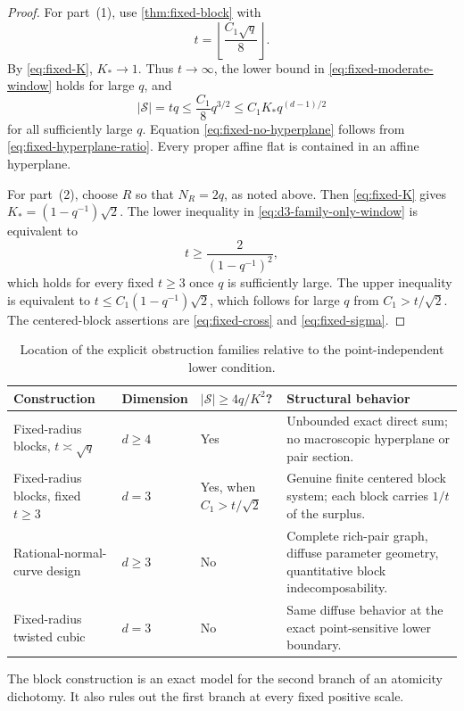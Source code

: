\documentclass[11pt,letterpaper]{amsart}
\theoremstyle{definition}
\theoremstyle{remark}
\newcommand{\1}{\mathbf 1}
\begin{document}
\begin{proof}
For part~\textup{(1)}, use \cref{thm:fixed-block} with
\[
 t=\left\lfloor\frac{C_1\sqrt q}{8}\right\rfloor.
\]
By \eqref{eq:fixed-K}, $K_*\to1$.  Thus $t\to\infty$, the lower bound in \eqref{eq:fixed-moderate-window} holds for large $q$, and
\[
 |\mathcal S|=tq\le\frac{C_1}{8}q^{3/2}
 \le C_1K_*q^{(d-1)/2}
\]
for all sufficiently large $q$.  Equation \eqref{eq:fixed-no-hyperplane} follows from \eqref{eq:fixed-hyperplane-ratio}.  Every proper affine flat is contained in an affine hyperplane.

For part~\textup{(2)}, choose $R$ so that $N_R=2q$, as noted above.  Then \eqref{eq:fixed-K} gives $K_*=(1-q^{-1})\sqrt2$.  The lower inequality in \eqref{eq:d3-family-only-window} is equivalent to
\[
 t\ge\frac{2}{(1-q^{-1})^2},
\]
which holds for every fixed $t\ge3$ once $q$ is sufficiently large.  The upper inequality is equivalent to $t\le C_1(1-q^{-1})\sqrt2$, which follows for large $q$ from $C_1>t/\sqrt2$.  The centered-block assertions are \eqref{eq:fixed-cross} and \eqref{eq:fixed-sigma}.
\end{proof}

\begin{table}[ht]
\centering
\small
\caption{Location of the explicit obstruction families relative to the point-independent lower condition.}
\label{tab:range-obstructions}
\begin{tabularx}{\textwidth}{@{}P{0.27\textwidth}P{0.16\textwidth}Y Y@{}}
\toprule
Construction & Dimension & $|\mathcal S|\ge4q/K^2$? & Structural behavior \\
\midrule
Fixed-radius blocks, $t\asymp\sqrt q$ & $d\ge4$ & Yes & Unbounded exact direct sum; no macroscopic hyperplane or pair section. \\
Fixed-radius blocks, fixed $t\ge3$ & $d=3$ & Yes, when $C_1>t/\sqrt2$ & Genuine finite centered block system; each block carries $1/t$ of the surplus. \\
Rational-normal-curve design & $d\ge3$ & No & Complete rich-pair graph, diffuse parameter geometry, quantitative block indecomposability. \\
Fixed-radius twisted cubic & $d=3$ & No & Same diffuse behavior at the exact point-sensitive lower boundary. \\
\bottomrule
\end{tabularx}
\end{table}

The block construction is an exact model for the second branch of an atomicity dichotomy.  It also rules out the first branch at every fixed positive scale.
\end{document}
